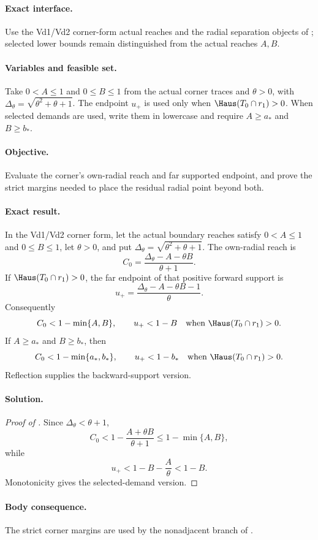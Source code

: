\paragraph{Exact interface.}
Use the Vd1/Vd2 corner-form actual reaches and the radial separation objects
of ; selected lower bounds remain
distinguished from the actual reaches $A,B$.

\paragraph{Variables and feasible set.}
Take $0<A\le1$ and $0\le B\le1$ from the actual corner traces and
$\theta>0$, with $\Delta_\theta=\sqrt{\theta^2+\theta+1}$.  The endpoint
$u_+$ is used only when $\Haus(T_0\cap r_1)>0$.  When selected demands are
used, write them in lowercase and require $A\ge a_*$ and $B\ge b_*$.

\paragraph{Objective.}
Evaluate the corner's own-radial reach and far supported endpoint, and prove
the strict margins needed to place the residual radial point beyond both.

\paragraph{Exact result.}

\begin{lemma}
\label{lem:app-vd-corner-margins}
In the Vd1/Vd2 corner form, let the actual boundary reaches satisfy
$0<A\le1$ and $0\le B\le1$, let $\theta>0$, and put
$\Delta_\theta=\sqrt{\theta^2+\theta+1}$.  The own-radial reach is
\[
 C_0=\frac{\Delta_\theta-A-\theta B}{\theta+1}.
\]
If $\Haus(T_0\cap r_1)>0$, the far endpoint of that positive forward
support is
\[
 u_+=\frac{\Delta_\theta-A-\theta B-1}{\theta}.
\]
Consequently
\[
 C_0<1-\min\{A,B\},
 \qquad u_+<1-B
 \quad\text{when }\Haus(T_0\cap r_1)>0.
\]
If $A\ge a_*$ and $B\ge b_*$, then
\[
 C_0<1-\min\{a_*,b_*\},
 \qquad u_+<1-b_*
 \quad\text{when }\Haus(T_0\cap r_1)>0.
\]
Reflection supplies the backward-support version.
\end{lemma}

\paragraph{Solution.}

\begin{proof}[Proof of ]
Since $\Delta_\theta<\theta+1$,
\[
 C_0<1-\frac{A+\theta B}{\theta+1}\le1-\min\{A,B\},
\]
while
\[
 u_+<1-B-\frac A\theta<1-B.
\]
Monotonicity gives the selected-demand version.
\end{proof}

\paragraph{Body consequence.}
The strict corner margins are used by the nonadjacent branch of
.
